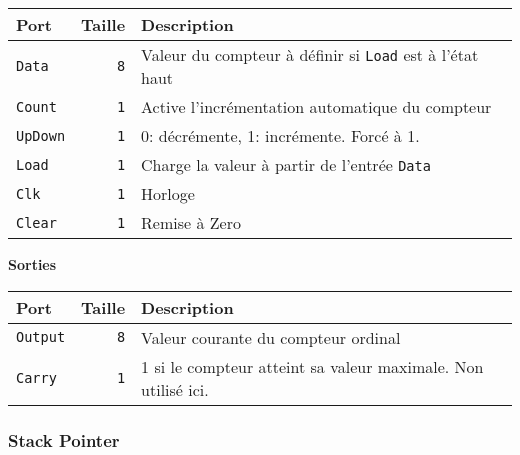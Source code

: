\documentclass{article}
\begin{document}
    \begin{tabular}{|l|r|l|}
        \hline
        \textbf{Port}   & \textbf{Taille} & \textbf{Description}                                            \\
        \hline

        \texttt{Data}   & \texttt{8}      & Valeur du compteur à définir si \texttt{Load} est à l'état haut \\
        \hline
        \texttt{Count}  & \texttt{1}      & Active l'incrémentation automatique du compteur                 \\
        \hline
        \texttt{UpDown} & \texttt{1}      & 0: décrémente, 1: incrémente.
        Forcé à 1.                        \\
        \hline
        \texttt{Load}   & \texttt{1}      & Charge la valeur à partir de l'entrée \texttt{Data}             \\
        \hline
        \texttt{Clk}    & \texttt{1}      & Horloge                                                         \\
        \hline
        \texttt{Clear}  & \texttt{1}      & Remise à Zero                                                   \\
        \hline


        \hline
    \end{tabular}

    \vspace{1em}
    \textbf{Sorties}\\

    \begin{tabular}{|l|r|l|}
        \hline
        \textbf{Port}     & \textbf{Taille} & \textbf{Description}                                          \\
        \hline

        \hline
        \texttt{Output} & \texttt{8}      & Valeur courante du compteur ordinal                           \\
        \hline
        \texttt{Carry}  & \texttt{1}      & 1 si le compteur atteint sa valeur maximale.
        Non utilisé ici. \\

        \hline
    \end{tabular}

    \subsubsection{Stack Pointer}
\end{document}
